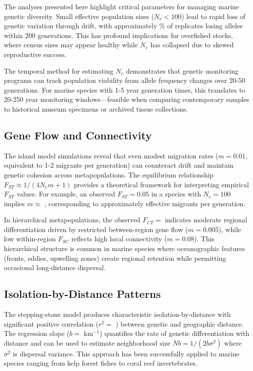 \documentclass[11pt,a4paper]{article}
\begin{document}
The analyses presented here highlight critical parameters for managing marine genetic diversity. Small
effective population sizes ($N_e < 100$) lead to rapid loss of genetic variation through drift, with
approximately \% of replicates losing alleles within 200 generations. This
has profound implications for overfished stocks, where census sizes may appear healthy while $N_e$ has
collapsed due to skewed reproductive success.

The temporal method for estimating $N_e$ demonstrates that genetic monitoring programs can track population
viability from allele frequency changes over 20-50 generations. For marine species with 1-5 year generation
times, this translates to 20-250 year monitoring windows—feasible when comparing contemporary samples to
historical museum specimens or archived tissue collections.

\subsection{Gene Flow and Connectivity}

The island model simulations reveal that even modest migration rates ($m = 0.01$, equivalent to 1-2
migrants per generation) can counteract drift and maintain genetic cohesion across metapopulations. The
equilibrium relationship $F_{ST} \approx 1/(4N_em + 1)$ provides a theoretical framework for interpreting
empirical $F_{ST}$ values. For example, an observed $F_{ST} = 0.05$ in a species with $N_e = 100$ implies
$m \approx$ , corresponding to approximately 
effective migrants per generation.

In hierarchical metapopulations, the observed $F_{CT} = $  indicates moderate regional
differentiation driven by restricted between-region gene flow ($m = 0.005$), while low within-region
$F_{SC}$ reflects high local connectivity ($m = 0.08$). This hierarchical structure is common in marine
species where oceanographic features (fronts, eddies, upwelling zones) create regional retention while
permitting occasional long-distance dispersal.

\subsection{Isolation-by-Distance Patterns}

The stepping-stone model produces characteristic isolation-by-distance with significant positive correlation
($r^2 = $ ) between genetic and geographic distance. The regression slope ($b = $
 km$^{-1}$) quantifies the rate of genetic differentiation with distance and can be
used to estimate neighborhood size $Nb = 1/(2b\sigma^2)$ where $\sigma^2$ is dispersal variance. This
approach has been successfully applied to marine species ranging from kelp forest fishes to coral reef
invertebrates.
\end{document}
